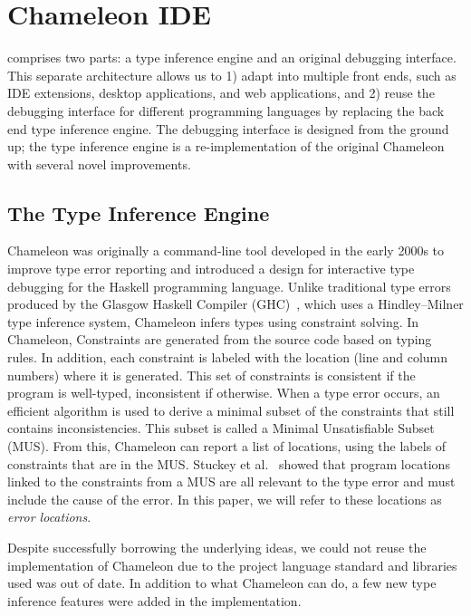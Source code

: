 \section{Chameleon IDE} \label{chameleon}

\chameleon{} comprises two parts: a type inference engine and an original debugging interface. This separate architecture allows us to 1) adapt \chameleon{} into multiple front ends, such as IDE extensions, desktop applications, and web applications, and 2) reuse the debugging interface for different programming languages by replacing the back end type inference engine. The debugging interface is designed from the ground up; the type inference engine is a re-implementation of the original Chameleon with several novel improvements.

\subsection{The Type Inference Engine}
\label{sec:typeinferenceengine}

Chameleon was originally a command-line tool developed in the early 2000s to improve type error reporting and introduced a design for interactive type debugging for the Haskell programming language. Unlike traditional type errors produced by the Glasgow Haskell Compiler (GHC)~\cite{ghc}, which uses a Hindley–Milner type inference system, Chameleon infers types using constraint solving. In Chameleon, Constraints are generated from the source code based on typing rules. In addition, each constraint is labeled with the location (line and column numbers) where it is generated. This set of constraints is consistent if the program is well-typed, inconsistent if otherwise. When a type error occurs, an efficient algorithm is used to derive a minimal subset of the constraints that still contains inconsistencies. This subset is called a Minimal Unsatisfiable Subset (MUS). From this, Chameleon can report a list of locations, using the labels of constraints that are in the MUS. Stuckey et al.~\cite{stuckey2003interactive} showed that program locations linked to the constraints from a MUS are all relevant to the type error and must include the cause of the error. In this paper, we will refer to these locations as \textit{error locations}.

Despite successfully borrowing the underlying ideas, we could not reuse the implementation of Chameleon due to the project language standard and libraries used was out of date. In addition to what Chameleon can do, a few new type inference features were added in the \chameleon{} implementation.



